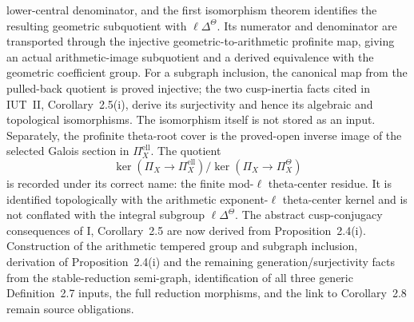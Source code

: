 \begin{definition}
  lower-central denominator, and the first isomorphism theorem identifies the
  resulting geometric subquotient with \(\ell\Delta^\Theta\).  Its numerator
  and denominator are transported through the injective geometric-to-arithmetic
  profinite map, giving an actual arithmetic-image subquotient and a derived
  equivalence with the geometric coefficient group.  For a subgraph inclusion,
  the canonical map from the pulled-back quotient is proved injective; the two
  cusp-inertia facts cited in IUT~II, Corollary~2.5(i), derive its surjectivity
  and hence its algebraic and topological isomorphisms.  The isomorphism itself
  is not stored as an input.  Separately, the
  profinite theta-root cover is the proved-open inverse image of the selected
  Galois section in \(\Pi_X^{\mathrm{ell}}\).  The quotient
  \[
    \ker(\Pi_X\to\Pi_X^{\mathrm{ell}})/
    \ker(\Pi_X\to\Pi_X^\Theta)
  \]
  is recorded under its correct name: the finite mod-\(\ell\) theta-center
  residue.  It is identified topologically with the arithmetic exponent-\(\ell\)
  theta-center kernel and is not conflated with the integral subgroup
  \(\ell\Delta^\Theta\).  The abstract cusp-conjugacy consequences of
  \IUT{} I, Corollary~2.5 are now derived from Proposition~2.4(i).  Construction
  of the arithmetic tempered group and subgraph inclusion, derivation of
  Proposition~2.4(i) and the remaining generation/surjectivity facts from the
  stable-reduction semi-graph, identification of all three generic
  Definition~2.7 inputs, the full reduction morphisms, and the link to
  Corollary~2.8 remain source obligations.
\end{definition}

